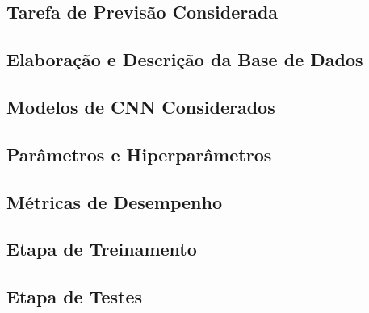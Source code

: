 
\subsection{Tarefa de Previsão Considerada}



\subsection{Elaboração e Descrição da Base de Dados}



\subsection{Modelos de CNN Considerados}


\subsection{Parâmetros e Hiperparâmetros}

\subsection{Métricas de Desempenho}


\subsection{Etapa de Treinamento}

\subsection{Etapa de Testes}
